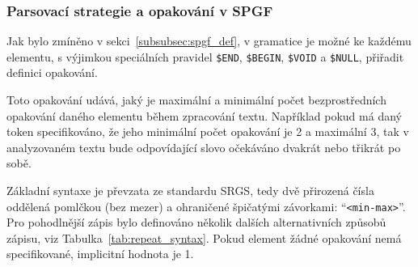 
\subsubsection{Parsovací strategie a opakování v SPGF}
Jak bylo zmíněno v sekci~\ref{subsubsec:spgf_def}, v gramatice je možné ke každému elementu,
s výjimkou speciálních pravidel \texttt{\$END}, \texttt{\$BEGIN}, \texttt{\$VOID} a \texttt{\$NULL},
přiřadit definici opakování.

Toto opakování udává, jaký je maximální a minimální počet bezprostředních opakování daného elementu během zpracování textu.
Například pokud má daný token specifikováno, že jeho minimální počet opakování je 2 a maximální 3,
tak v analyzovaném textu bude odpovídající slovo očekáváno dvakrát nebo třikrát po sobě.

Základní syntaxe je převzata ze standardu SRGS,
tedy dvě přirozená čísla oddělená pomlčkou (bez mezer) a ohraničené špičatými závorkami: \enquote{\texttt{<min-max>}}.
Pro pohodlnější zápis bylo definováno několik dalších alternativních
způsobů zápisu, viz Tabulka~\ref{tab:repeat_syntax}.
Pokud element žádné opakování nemá specifikované, implicitní hodnota je 1.

